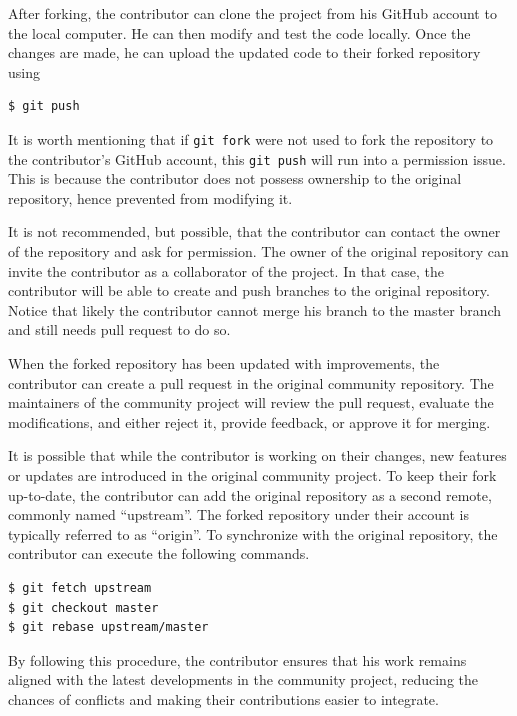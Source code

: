 After forking, the contributor can clone the project from his GitHub account to the local computer. He can then modify and test the code locally. Once the changes are made, he can upload the updated code to their forked repository using
\begin{lstlisting}
$ git push
\end{lstlisting}

\begin{shortbox}

It is worth mentioning that if \verb|git fork| were not used to fork the repository to the contributor's GitHub account, this \verb|git push| will run into a permission issue. This is because the contributor does not possess ownership to the original repository, hence prevented from modifying it.

It is not recommended, but possible, that the contributor can contact the owner of the repository and ask for permission. The owner of the original repository can invite the contributor as a collaborator of the project. In that case, the contributor will be able to create and push branches to the original repository. Notice that likely the contributor cannot merge his branch to the master branch and still needs pull request to do so.

\end{shortbox}

When the forked repository has been updated with improvements, the contributor can create a pull request in the original community repository. The maintainers of the community project will review the pull request, evaluate the modifications, and either reject it, provide feedback, or approve it for merging.

It is possible that while the contributor is working on their changes, new features or updates are introduced in the original community project. To keep their fork up-to-date, the contributor can add the original repository as a second remote, commonly named ``upstream''. The forked repository under their account is typically referred to as ``origin''. To synchronize with the original repository, the contributor can execute the following commands.
\begin{lstlisting}
$ git fetch upstream
$ git checkout master
$ git rebase upstream/master
\end{lstlisting}

By following this procedure, the contributor ensures that his work remains aligned with the latest developments in the community project, reducing the chances of conflicts and making their contributions easier to integrate.
